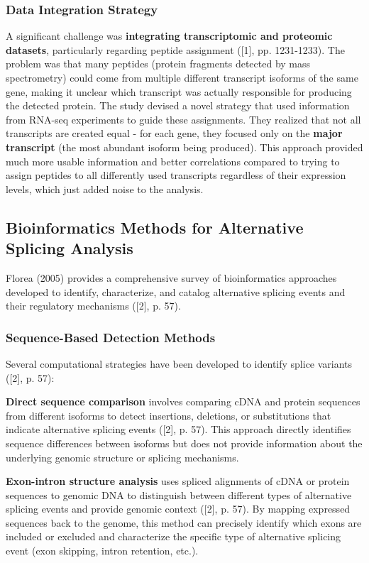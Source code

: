 \documentclass[12pt,a4paper]{article}
\begin{document}
\subsubsection{Data Integration Strategy}

A significant challenge was \textbf{integrating transcriptomic and proteomic datasets}, particularly regarding peptide assignment ([1], pp. 1231-1233). The problem was that many peptides (protein fragments detected by mass spectrometry) could come from multiple different transcript isoforms of the same gene, making it unclear which transcript was actually responsible for producing the detected protein. The study devised a novel strategy that used information from RNA-seq experiments to guide these assignments. They realized that not all transcripts are created equal - for each gene, they focused only on the \textbf{major transcript} (the most abundant isoform being produced). This approach provided much more usable information and better correlations compared to trying to assign peptides to all differently used transcripts regardless of their expression levels, which just added noise to the analysis.

\subsection{Bioinformatics Methods for Alternative Splicing Analysis}

Florea (2005) provides a comprehensive survey of bioinformatics approaches developed to identify, characterize, and catalog alternative splicing events and their regulatory mechanisms ([2], p. 57).

\subsubsection{Sequence-Based Detection Methods}

Several computational strategies have been developed to identify splice variants ([2], p. 57):

\textbf{Direct sequence comparison} involves comparing cDNA and protein sequences from different isoforms to detect insertions, deletions, or substitutions that indicate alternative splicing events ([2], p. 57). This approach directly identifies sequence differences between isoforms but does not provide information about the underlying genomic structure or splicing mechanisms.

\textbf{Exon-intron structure analysis} uses spliced alignments of cDNA or protein sequences to genomic DNA to distinguish between different types of alternative splicing events and provide genomic context ([2], p. 57). By mapping expressed sequences back to the genome, this method can precisely identify which exons are included or excluded and characterize the specific type of alternative splicing event (exon skipping, intron retention, etc.).
\end{document}

